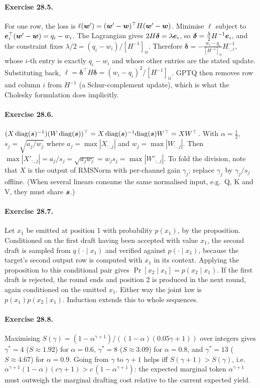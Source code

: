 \paragraph{Exercise 28.5.} For one row, the loss is
$\ell(\bm{w}')=(\bm{w}'-\bm{w})^\top H(\bm{w}'-\bm{w})$. Minimise $\ell$ subject to
$\bm{e}_i^\top(\bm{w}'-\bm{w})=q_i-w_i$. The Lagrangian gives
$2H\boldsymbol\delta=\lambda\bm{e}_i$, so $\boldsymbol\delta=\frac{\lambda}{2}H^{-1}\bm{e}_i$,
and the constraint fixes $\lambda/2=(q_i-w_i)/[H^{-1}]_{ii}$. Therefore
$\boldsymbol\delta=-\frac{w_i-q_i}{[H^{-1}]_{ii}}H^{-1}_{:,i}$, whose $i$-th entry is
exactly $q_i-w_i$ and whose other entries are the stated update. Substituting back,
$\ell=\boldsymbol\delta^\top H\boldsymbol\delta=(w_i-q_i)^2/[H^{-1}]_{ii}$. GPTQ then
removes row and column $i$ from $H^{-1}$ (a Schur-complement update), which is what the
Cholesky formulation does implicitly.

\paragraph{Exercise 28.6.}
$(X\,\mathrm{diag}(\bm{s})^{-1})(W\,\mathrm{diag}(\bm{s}))^\top
=X\,\mathrm{diag}(\bm{s})^{-1}\mathrm{diag}(\bm{s})W^\top=XW^\top$.
With $\alpha=\tfrac12$, $s_j=\sqrt{a_j/w_j}$ where $a_j=\max|X_{:,j}|$ and
$w_j=\max|W_{:,j}|$. Then $\max|X'_{:,j}|=a_j/s_j=\sqrt{a_jw_j}=w_js_j=\max|W'_{:,j}|$.
To fold the division, note that $X$ is the output of RMSNorm with per-channel gain
$\gamma_j$; replace $\gamma_j$ by $\gamma_j/s_j$ offline. (When several linears consume
the same normalised input, e.g.\ Q, K and V, they must share $\bm{s}$.)

\paragraph{Exercise 28.7.} Let $x_1$ be emitted at position 1 with probability $p(x_1)$,
by the proposition. Conditioned on the first draft having been accepted with value $x_1$,
the second draft is sampled from $q(\cdot\mid x_1)$ and verified against
$p(\cdot\mid x_1)$, because the target's second output row is computed with $x_1$ in its
context. Applying the proposition to this conditional pair gives
$\Pr[x_2\mid x_1]=p(x_2\mid x_1)$. If the first draft is rejected, the round ends and
position 2 is produced in the next round, again conditioned on the emitted $x_1$.
Either way the joint law is $p(x_1)p(x_2\mid x_1)$. Induction extends this to whole
sequences.

\paragraph{Exercise 28.8.} Maximising
$S(\gamma)=(1-\alpha^{\gamma+1})/((1-\alpha)(0.05\gamma+1))$ over integers gives
$\gamma^{*}=4$ ($S\approx1.92$) for $\alpha=0.6$, $\gamma^{*}=8$ ($S\approx3.09$) for
$\alpha=0.8$, and $\gamma^{*}=13$ ($S\approx4.67$) for $\alpha=0.9$. Going from $\gamma$
to $\gamma+1$ helps iff
$S(\gamma+1)>S(\gamma)$, i.e.\
$\alpha^{\gamma+1}(1-\alpha)(c\gamma+1)>c\,(1-\alpha^{\gamma+1})$: the expected marginal
token $\alpha^{\gamma+1}$ must outweigh the marginal drafting cost relative to the
current expected yield.

